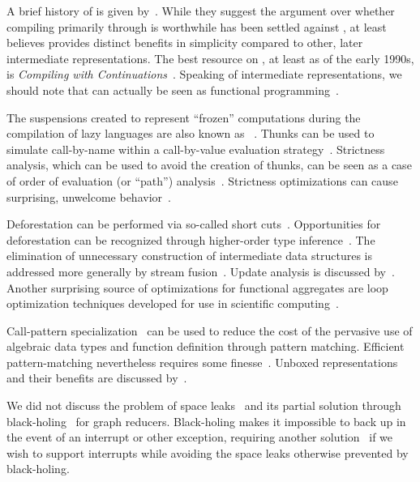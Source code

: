 A brief history of \CPS is given by~\citet{Flanagan:The-essence:2004}. While they suggest the argument over whether compiling primarily through \CPS is worthwhile has been settled against \CPS, \citet{Kennedy:Compiling:2007} at least believes \CPS provides distinct benefits in simplicity compared to other, later intermediate representations. The best resource on \CPS{}, at least as of the early 1990s, is \textit{Compiling with Continuations}~\citep{Appel:Compiling:1992}. Speaking of intermediate representations, we should note that \SSA can actually be seen as functional programming~\citep{Appel:Compiling:1992}.

The suspensions created to represent ``frozen'' computations during the compilation of lazy languages are also known as ~\citep{Ingerman:Thunks:1961}. Thunks can be used to simulate call-by-name within a call-by-value evaluation strategy~\citep{Hatcliff:Thunks:1997}. Strictness analysis, which can be used to avoid the creation of thunks, can be seen as a case of order of evaluation (or ``path'') analysis~\citep{Bloss:Path:1994}. Strictness optimizations can cause surprising, unwelcome behavior~\citep{Beemster:Strictness:1994}.

Deforestation can be performed via so-called short cuts~\citep{Gill:A-short:1993}. Opportunities for deforestation can be recognized through higher-order type inference~\citep{Chitil:Type:1999}. The elimination of unnecessary construction of intermediate data structures is addressed more generally by stream fusion~\citep{Coutts:Stream:2007}. Update analysis is discussed by~\citet{Bloss:Update:1989}. Another surprising source of optimizations for functional aggregates are loop optimization techniques developed for use in scientific computing~\citep{Anderson:Compilation:1990}.

Call-pattern specialization~\citep{Peyton-Jones:Call-pattern:2007} can be used to reduce the cost of the pervasive use of algebraic data types and function definition through pattern matching. Efficient pattern-matching nevertheless requires some finesse~\citep{Le-Fessant:Optimizing:2001}. Unboxed representations and their benefits are discussed by~\citet{Peyton-Jones:Unboxed:1991,Thiemann:Unboxed:1995}.

We did not discuss the problem of space leaks~\citep{Wadler:Fixing:1987} and its partial solution through black-holing~\citep{Jones:Tail:1992} for graph reducers. Black-holing makes it impossible to back up in the event of an interrupt or other exception, requiring another solution~\citep{Reid:Putting:1999} if we wish to support interrupts while avoiding the space leaks otherwise prevented by black-holing.

